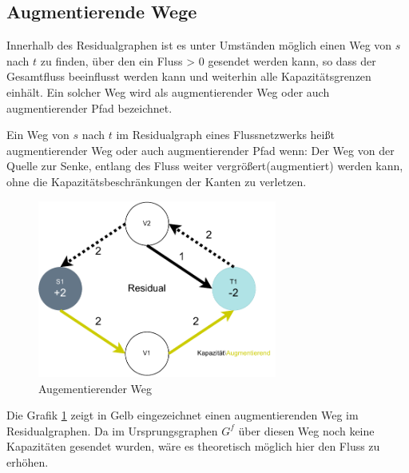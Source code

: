 \newpage
\subsection{Augmentierende Wege}
Innerhalb des Residualgraphen ist es unter Umständen möglich einen Weg von $s$ nach $t$ zu finden, über den ein Fluss > 0 gesendet werden kann, so dass der Gesamtfluss beeinflusst werden kann und weiterhin alle Kapazitätsgrenzen einhält. Ein solcher Weg wird als augmentierender Weg oder auch augmentierender Pfad bezeichnet.
\begin{definition}
Ein Weg von $s$ nach $t$ im Residualgraph eines Flussnetzwerks heißt augmentierender Weg oder auch augmentierender Pfad wenn:
Der Weg von der Quelle zur Senke, entlang des Fluss weiter vergrößert(augmentiert) werden kann, ohne die Kapazitätsbeschränkungen der Kanten zu verletzen.
\end{definition}
\begin{figure}[htb]
\centering
\includegraphics[width=0.7\textwidth]{img/steffen/augmented_way.drawio.pdf}
\caption{Augementierender Weg}
\label{fig:augmented_way}
\end{figure}
Die Grafik \ref{fig:augmented_way} zeigt in Gelb eingezeichnet einen augmentierenden Weg im Residualgraphen. Da im Ursprungsgraphen $G^f$ über diesen Weg noch keine Kapazitäten gesendet wurden, wäre es theoretisch möglich hier den Fluss zu erhöhen.

